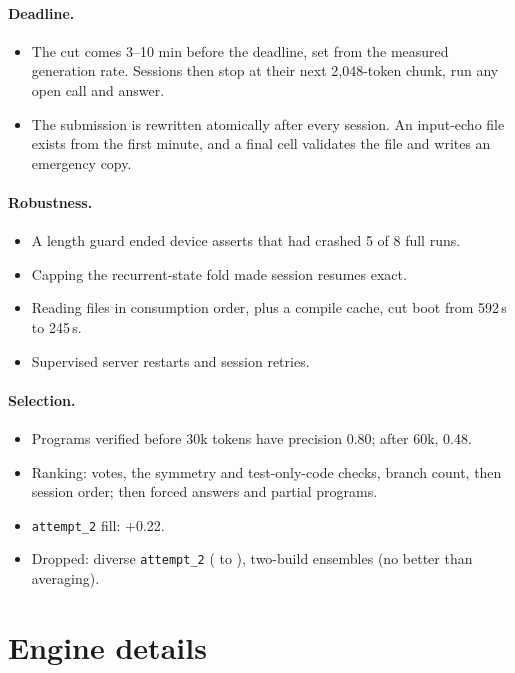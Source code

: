\documentclass[10pt]{article}
\newcommand{\appminus}{\textminus}
\newcommand{\appminus}{\symbol{"2212}}
\newcommand{\mn}{\appminus}                     %
\begin{document}
\paragraph{Deadline.}
\begin{itemize}
  \item The cut comes 3--10 min before the deadline, set from the measured generation rate. Sessions then stop at their
        next 2,048-token chunk, run any open call and answer.
  \item The submission is rewritten atomically after every session. An input-echo file exists from the first minute,
        and a final cell validates the file and writes an emergency copy.
\end{itemize}

\paragraph{Robustness.}
\begin{itemize}
  \item A length guard ended device asserts that had crashed 5 of 8 full runs.
  \item Capping the recurrent-state fold made session resumes exact.
  \item Reading files in consumption order, plus a compile cache, cut boot from 592\,s to 245\,s.
  \item Supervised server restarts and session retries.
\end{itemize}

\paragraph{Selection.}
\begin{itemize}
  \item Programs verified before 30k tokens have precision 0.80; after 60k, 0.48.
  \item Ranking: votes, the symmetry and test-only-code checks, branch count, then session order; then forced answers
        and partial programs.
  \item \texttt{attempt\_2} fill: +0.22.
  \item Dropped: diverse \texttt{attempt\_2} (\mn0.10 to \mn0.48), two-build ensembles (no better than averaging).
\end{itemize}

\section{Engine details}\label{app:engine}
\end{document}
